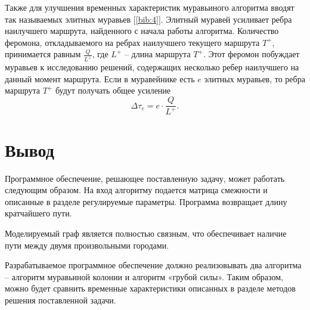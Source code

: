 	\par Также для улучшения временных характеристик муравьиного алгоритма вводят так называемых элитных муравьев [\ref{bib:4}]. Элитный муравей усиливает ребра наилучшего маршрута, найденного с начала работы алгоритма. Количество феромона, откладываемого на ребрах наилучшего текущего маршрута $T^+$, принимается равным \begin{math} \frac{Q}{L^+} \end{math}, где $L^+$ -- длина маршрута $T^+$. Этот феромон побуждает муравьев к исследованию решений, содержащих несколько ребер наилучшего на данный момент маршрута. Если в муравейнике есть $e$ элитных муравьев, то ребра маршрута $T^+$ будут получать общее усиление
	\begin{equation}\label{elit}
	\Delta\tau_{e} = e \cdot \frac{Q}{L^+}.
	\end{equation}

	\section*{Вывод}
\par Программное обеспечение, решающее поставленную задачу, может работать следующим образом. На вход алгоритму подается матрица смежности и описанные в разделе регулируемые параметры. Программа возвращает длину кратчайшего пути. 

Моделируемый граф является полностью связным, что обеспечивает наличие пути между двумя произвольными городами.

Разрабатываемое программное обеспечение должно реализовывать два алгоритма -- алгоритм муравьиной колонии и алгоритм «грубой силы». Таким образом, можно будет сравнить временные характеристики описанных в разделе методов решения поставленной задачи.

\newpage